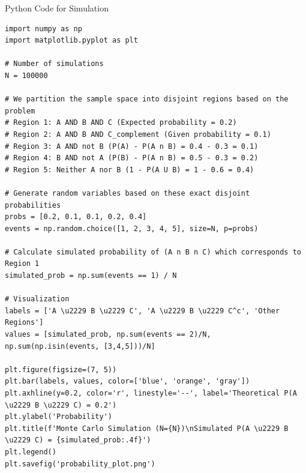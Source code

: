 \documentclass{beamer}
\begin{document}
\begin{frame}[fragile]{Python Code for Simulation}
\begin{lstlisting}
import numpy as np
import matplotlib.pyplot as plt

# Number of simulations
N = 100000

# We partition the sample space into disjoint regions based on the problem
# Region 1: A AND B AND C (Expected probability = 0.2)
# Region 2: A AND B AND C_complement (Given probability = 0.1)
# Region 3: A AND not B (P(A) - P(A n B) = 0.4 - 0.3 = 0.1)
# Region 4: B AND not A (P(B) - P(A n B) = 0.5 - 0.3 = 0.2)
# Region 5: Neither A nor B (1 - P(A U B) = 1 - 0.6 = 0.4)

# Generate random variables based on these exact disjoint probabilities
probs = [0.2, 0.1, 0.1, 0.2, 0.4]
events = np.random.choice([1, 2, 3, 4, 5], size=N, p=probs)

# Calculate simulated probability of (A n B n C) which corresponds to Region 1
simulated_prob = np.sum(events == 1) / N

# Visualization
labels = ['A \u2229 B \u2229 C', 'A \u2229 B \u2229 C^c', 'Other Regions']
values = [simulated_prob, np.sum(events == 2)/N, np.sum(np.isin(events, [3,4,5]))/N]

plt.figure(figsize=(7, 5))
plt.bar(labels, values, color=['blue', 'orange', 'gray'])
plt.axhline(y=0.2, color='r', linestyle='--', label='Theoretical P(A \u2229 B \u2229 C) = 0.2')
plt.ylabel('Probability')
plt.title(f'Monte Carlo Simulation (N={N})\nSimulated P(A \u2229 B \u2229 C) = {simulated_prob:.4f}')
plt.legend()
plt.savefig('probability_plot.png')
\end{lstlisting}
\end{frame}
\end{document}
